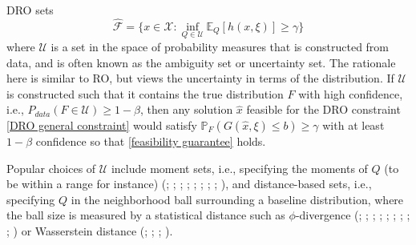 \documentclass[mnsc,blindrev]{informs4} %
\begin{document}
\begin{example}\label{example:DRO}
DRO sets
\begin{equation}\hat{\mathcal F}= \{x\in\mathcal X:   \inf_{Q\in\mathcal U}\mathbb E_Q[h(x,\xi)]\geq\gamma\}\label{DRO general constraint}
\end{equation}
where $\mathcal U$ is a set in the space of probability measures that is constructed from data, and is often known as the ambiguity set or uncertainty set. The rationale here is similar to RO, but views the uncertainty in terms of the distribution. If $\mathcal U$ is constructed such that it contains the true distribution $F$ with high confidence, i.e., $P_{data}(F\in\mathcal U)\geq1-\beta$, then any solution $\hat x$  feasible for the DRO constraint \eqref{DRO general constraint} would satisfy $\mathbb P_F(G(\hat x,\xi)\leq b)\geq\gamma$ with at least $1-\beta$ confidence so that \eqref{feasibility guarantee} holds.

Popular choices of $\mathcal U$ include moment sets, i.e., specifying the moments of $Q$ (to be within a range for instance) (\cite{ghaoui2003worst}; \cite{delage2010distributionally}; \cite{xu2012optimization}; \cite{wiesemann2014distributionally}; \cite{goh2010distributionally}; \cite{natarajan2008incorporating}; \cite{van2016generalized}; \cite{doan2015robustness}; \cite{hanasusanto2015distributionally}), and distance-based sets, i.e., specifying $Q$ in the neighborhood ball surrounding a baseline distribution, where the ball size is measured by a statistical distance such as $\phi$-divergence (\cite{petersen2000minimax}; \cite{ben2013robust}; \cite{glasserman2014robust}; \cite{lam2016robust}; \cite{lam2017sensitivity}; \cite{hu2013kullback}; \cite{jiang2016data}; \cite{gotoh2018robust}; \cite{dupuis2016path}; \cite{bayraksan2015data}) or Wasserstein distance (\cite{esfahani2018data}; \cite{blanchet2019quantifying}; \cite{gao2016distributionally}; \cite{xie2018distributionally}).


\end{example}
\end{document}
